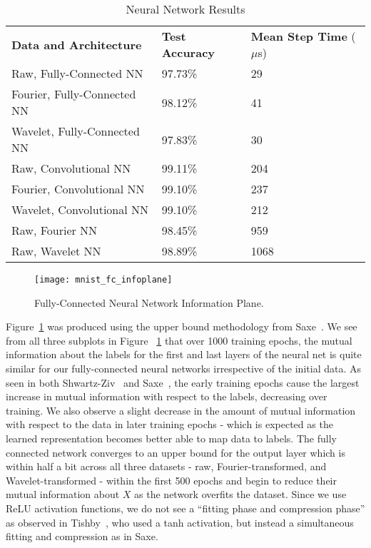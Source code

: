 \begin{table}[h!]
\centering	
\begin{tabular}{l|ll}
\textbf{Data and Architecture}  & \textbf{Test Accuracy} & \textbf{Mean Step Time} ($\mu$s) \\\cline{1-3}
Raw, Fully-Connected NN            & 97.73\%         & 29\\
Fourier, Fully-Connected NN        & 98.12\%         & 41\\
Wavelet, Fully-Connected NN        & 97.83\%         & 30\\
\hline
Raw, Convolutional NN              & 99.11\%         & 204\\ 
Fourier, Convolutional NN          & 99.10\%         & 237\\
Wavelet, Convolutional NN          & 99.10\%         & 212\\
\hline
Raw, Fourier NN                    & 98.45\%         & 959\\
Raw, Wavelet NN                    & 98.89\%         & 1068\\ 
\end{tabular}
\caption{Neural Network Results}
\label{Tab:test}
\end{table}

\begin{figure}[h]
\begin{center}
\texttt{[image: mnist\_fc\_infoplane]}
\caption{Fully-Connected Neural Network Information Plane.}
\label{fig:mnist fc infoplane}
\centering
\end{center}
\end{figure}
Figure~\ref{fig:mnist fc infoplane} was produced using the upper bound methodology from Saxe~\cite{saxe2019information}. 
We see from all three subplots in Figure ~\ref{fig:mnist fc infoplane} that over 1000 training epochs, the mutual information about the labels for the first and last layers of the neural net is quite similar for our fully-connected neural networks irrespective of the initial data.
As seen in both Shwartz-Ziv~\cite{shwartz2017opening} and Saxe~\cite{saxe2019information}, the early training epochs cause the largest increase in mutual information with respect to the labels, decreasing over training. 
We also observe a slight decrease in the amount of mutual information with respect to the data in later training epochs - which is expected as the learned representation becomes better able to map data to labels. 
The fully connected network converges to an upper bound for the output layer which is within half a bit across all three datasets - raw, Fourier-transformed, and Wavelet-transformed - within the first 500 epochs and begin to reduce their mutual information about $X$ as the network overfits the dataset.
Since we use ReLU activation functions, we do not see a ``fitting phase and compression phase'' as observed in Tishby~\cite{tishby2015deep}, who used a tanh activation, but instead a simultaneous fitting and compression as in Saxe.

